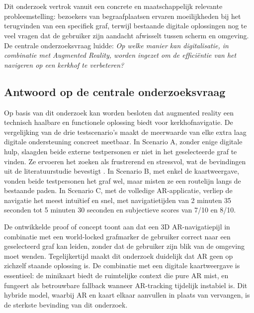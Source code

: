 \chapter{}%
\label{ch:conclusie}

Dit onderzoek vertrok vanuit een concrete en maatschappelijk relevante
probleemstelling: bezoekers van begraafplaatsen ervaren moeilijkheden bij het
terugvinden van een specifiek graf, terwijl bestaande digitale oplossingen nog
te veel vragen dat de gebruiker zijn aandacht afwisselt tussen scherm en omgeving.
De centrale onderzoeksvraag luidde: \textit{Op welke manier kan digitalisatie,
    in combinatie met Augmented Reality, worden ingezet om de efficiëntie van het
    navigeren op een kerkhof te verbeteren?}

\section{Antwoord op de centrale onderzoeksvraag}

Op basis van dit onderzoek kan worden besloten dat augmented reality een
technisch haalbare en functionele oplossing biedt voor kerkhofnavigatie. De
vergelijking van de drie testscenario's maakt de meerwaarde van elke extra laag
digitale ondersteuning concreet meetbaar. In Scenario A, zonder enige digitale
hulp, slaagden beide externe testpersonen er niet in het geselecteerde graf te
vinden. Ze ervoeren het zoeken als frustrerend en stressvol, wat de bevindingen
uit de literatuurstudie bevestigt \autocite{Haekkilae2022}. In Scenario B,
met enkel de kaartweergave, vonden beide testpersonen het graf wel, maar misten
ze een routelijn langs de bestaande paden. In Scenario C, met de volledige
AR-applicatie, verliep de navigatie het meest intuïtief en snel, met navigatietijden
van 2 minuten 35 seconden tot  5 minuten 30 seconden en subjectieve scores van 7/10 en 8/10.

De ontwikkelde proof of concept toont aan dat een 3D AR-navigatiepijl in
combinatie met een world-locked grafmarker de gebruiker correct naar een
geselecteerd graf kan leiden, zonder dat de gebruiker zijn blik van de omgeving
moet wenden. Tegelijkertijd maakt dit onderzoek duidelijk dat AR geen op
zichzelf staande oplossing is. De combinatie met een digitale kaartweergave is
essentieel: de minikaart biedt de ruimtelijke context die pure AR mist, en
fungeert als betrouwbare fallback wanneer AR-tracking tijdelijk instabiel is.
Dit hybride model, waarbij AR en kaart elkaar aanvullen in plaats van vervangen,
is de sterkste bevinding van dit onderzoek.

